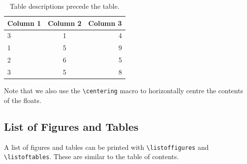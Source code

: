 \documentclass[11pt, twoside]{article}
\begin{document}
\begin{table}[H]
    \centering
    \caption{Table descriptions precede the table.}\label{tab:table}
    \begin{tabular}{l c r}
        \toprule
        \textbf{Column 1} & \textbf{Column 2} & \textbf{Column 3} \\
        \midrule
        3                 & 1                 & 4                 \\
        1                 & 5                 & 9                 \\
        2                 & 6                 & 5                 \\
        3                 & 5                 & 8                 \\
        \bottomrule
    \end{tabular}
\end{table}
Note that we also use the \lstinline{\centering} macro to horizontally centre the contents of the floats.
\subsection{List of Figures and Tables}
A list of figures and tables can be printed with \lstinline{\listoffigures} and  \lstinline{\listoftables}.
These are similar to the table of contents.
\end{document}
